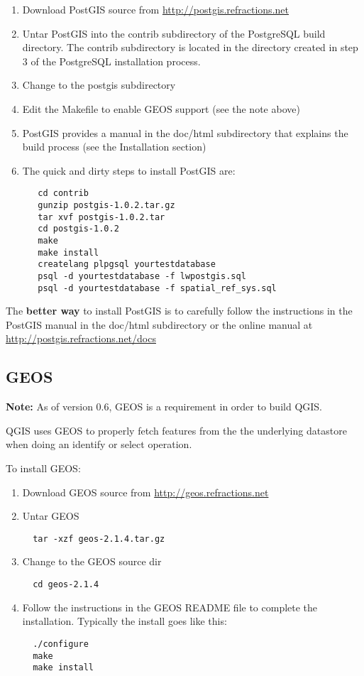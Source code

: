 \begin{enumerate}
\item Download PostGIS source from \url{http://postgis.refractions.net} \cite{PostGISweb} 
\item Untar PostGIS into the contrib subdirectory of the PostgreSQL build
directory. The contrib subdirectory is located in the directory created in
step 3 of the PostgreSQL installation process.
\item Change to the postgis subdirectory
\item Edit the Makefile to enable GEOS support (see the note above)
\item PostGIS provides a manual in the doc/html subdirectory that explains
the build process (see the Installation section)
\item The quick and dirty steps to install PostGIS are:
  
\begin{verbatim}
   cd contrib
   gunzip postgis-1.0.2.tar.gz 
   tar xvf postgis-1.0.2.tar 
   cd postgis-1.0.2 
   make 
   make install 
   createlang plpgsql yourtestdatabase 
   psql -d yourtestdatabase -f lwpostgis.sql 
   psql -d yourtestdatabase -f spatial_ref_sys.sql 
\end{verbatim}
\end{enumerate}

The \textbf{better way} to install PostGIS is to carefully follow the
instructions in the PostGIS manual in the doc/html subdirectory or the
online manual at \url{http://postgis.refractions.net/docs}

\subsection{GEOS}\label{label_geos}

\textbf{Note:} As of version 0.6, GEOS is a requirement in order to build
QGIS.

QGIS uses GEOS to properly fetch features from the the underlying
datastore when doing an identify or select operation.

To install GEOS:
  
  \begin{enumerate}
  \item Download GEOS source from \url{http://geos.refractions.net} \cite{GEOSweb}
  \item Untar GEOS
  \begin{verbatim}
  tar -xzf geos-2.1.4.tar.gz
  \end{verbatim}
  \item Change to the GEOS source dir
  \begin{verbatim}
  cd geos-2.1.4
  \end{verbatim}
  \item Follow the instructions in the GEOS README file to complete the
installation. Typically the install goes like this:
  \begin{verbatim}
  ./configure
  make
  make install
  \end{verbatim}

  \end{enumerate}


